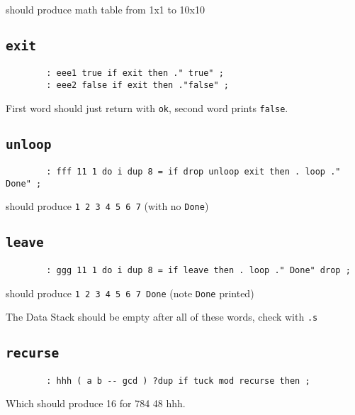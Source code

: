 should produce math table from 1x1 to 10x10


\subsection{\texttt{exit}}

\begin{lstlisting}
        : eee1 true if exit then ." true" ; 
        : eee2 false if exit then ."false" ; 
\end{lstlisting}

First word should just return with \texttt{ok}, second word prints \texttt{false}.


\subsection{\texttt{unloop}}

\begin{lstlisting}
        : fff 11 1 do i dup 8 = if drop unloop exit then . loop ." Done" ; 
\end{lstlisting}

should produce \texttt{1 2 3 4 5 6 7} (with no \texttt{Done})


\subsection{\texttt{leave}}

\begin{lstlisting}
        : ggg 11 1 do i dup 8 = if leave then . loop ." Done" drop ; 
\end{lstlisting}

should produce \texttt{1 2 3 4 5 6 7 Done} (note \texttt{Done} printed)

The Data Stack should be empty after all of these words, check with \texttt{.s}


\subsection{\texttt{recurse}}

\begin{lstlisting}
        : hhh ( a b -- gcd ) ?dup if tuck mod recurse then ;
\end{lstlisting}

Which should produce 16 for 784 48 hhh. 



